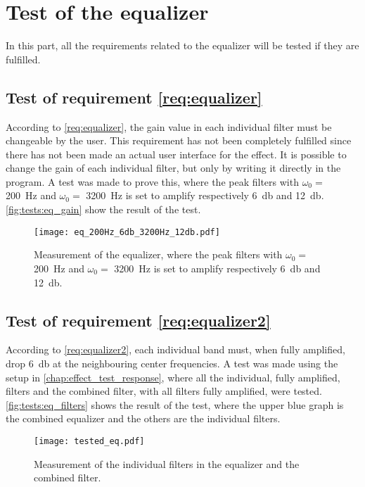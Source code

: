 \newpage
\section{Test of the equalizer}
In this part, all the requirements related to the equalizer will be tested if they are fulfilled. 


\subsection{Test of requirement \autoref{req:equalizer}}
According to \autoref{req:equalizer}, the gain value in each individual filter must be changeable by the user. This requirement has not been completely fulfilled since there has not been made an actual user interface for the effect. It is possible to change the gain of each individual filter, but only by writing it directly in the program. A test was made to prove this, where the peak filters with $\omega_0 =$ \SI{200}{\hertz} and $\omega_0 =$ \SI{3200}{\hertz} is set to amplify respectively \SI{6}{\decibel} and \SI{12}{\decibel}. 
\autoref{fig:tests:eq_gain} show the result of the test.

\begin{figure}[htbp!]
    \centering
        \texttt{[image: eq\_200Hz\_6db\_3200Hz\_12db.pdf]}
        \caption{Measurement of the equalizer, where the peak filters with $\omega_0 =$ \SI{200}{\hertz} and $\omega_0 =$ \SI{3200}{\hertz} is set to amplify respectively \SI{6}{\decibel} and \SI{12}{\decibel}.}
        \label{fig:tests:eq_gain}
  \end{figure}



\subsection{Test of requirement \autoref{req:equalizer2}}
According to \autoref{req:equalizer2}, each individual band must, when fully amplified, drop \SI{6}{\decibel} at the neighbouring center frequencies. A test was made using  the setup in \autoref{chap:effect_test_response}, where all the individual, fully amplified, filters and the combined filter, with all filters fully amplified, were tested. \autoref{fig:tests:eq_filters} shows the result of the test, where the upper blue graph is the combined equalizer and the others are the individual filters.

\begin{figure}[htbp!]
    \centering
        \texttt{[image: tested\_eq.pdf]}
        \caption{Measurement of the individual filters in the equalizer and the combined filter.}
        \label{fig:tests:eq_filters}
  \end{figure}
  
